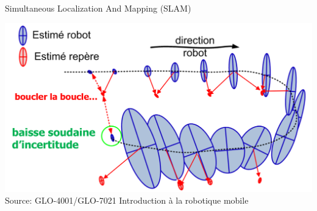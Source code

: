 \begin{frame}{Simultaneous Localization And Mapping (SLAM)}
    \begin{center}
        \href{https://www.youtube.com/watch?v=y7OnimZRj2w}{\includegraphics[width=1.0\textwidth]{./media/loop_closure.png}}
        {\tiny Source: GLO-4001/GLO-7021 Introduction à la robotique mobile}
    \end{center}
\end{frame}

